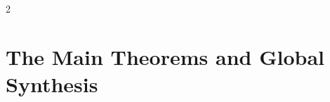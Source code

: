 \documentclass[10pt]{article}
\begin{document}
\newpage

\begin{multicols}{2}
\tableofcontents
\end{multicols}

\newpage

\section{The Main Theorems and Global Synthesis}
\end{document}
